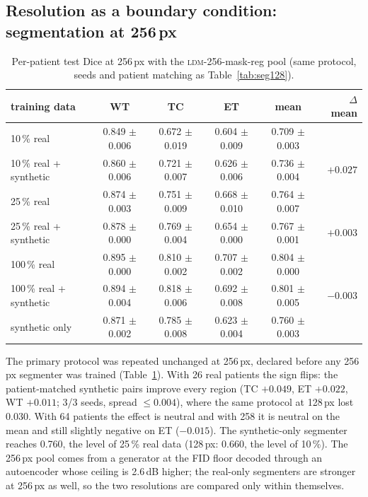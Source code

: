 \documentclass[10pt,a4paper]{article}
\newcommand{\ldm}[1]{\textsc{ldm-#1}}
\begin{document}
\subsection{Resolution as a boundary condition: segmentation at 256\,px}
\label{sec:256}
\begin{table}[t]
  \centering\small
  \caption{Per-patient test Dice at 256\,px with the \ldm{256}-mask-reg pool (same protocol, seeds and patient matching as Table~\ref{tab:seg128}).}
  \label{tab:seg256}
  \begin{tabular}{lccccr}
    \toprule
    training data & WT & TC & ET & mean & $\Delta$ mean \\
    \midrule
    10\,\% real & 0.849 $\pm$ 0.006 & 0.672 $\pm$ 0.019 & 0.604 $\pm$ 0.009 & 0.709 $\pm$ 0.003 & \\
    10\,\% real + synthetic & 0.860 $\pm$ 0.006 & 0.721 $\pm$ 0.007 & 0.626 $\pm$ 0.006 & 0.736 $\pm$ 0.004 & $\mathbf{+0.027}$ \\
    25\,\% real & 0.874 $\pm$ 0.003 & 0.751 $\pm$ 0.009 & 0.668 $\pm$ 0.010 & 0.764 $\pm$ 0.007 & \\
    25\,\% real + synthetic & 0.878 $\pm$ 0.000 & 0.769 $\pm$ 0.004 & 0.654 $\pm$ 0.000 & 0.767 $\pm$ 0.001 & $+0.003$ \\
    100\,\% real & 0.895 $\pm$ 0.000 & 0.810 $\pm$ 0.002 & 0.707 $\pm$ 0.002 & 0.804 $\pm$ 0.000 & \\
    100\,\% real + synthetic & 0.894 $\pm$ 0.004 & 0.818 $\pm$ 0.006 & 0.692 $\pm$ 0.008 & 0.801 $\pm$ 0.005 & $-0.003$ \\
    synthetic only & 0.871 $\pm$ 0.002 & 0.785 $\pm$ 0.008 & 0.623 $\pm$ 0.004 & 0.760 $\pm$ 0.003 & \\
    \bottomrule
  \end{tabular}
\end{table}

The primary protocol was repeated unchanged at 256\,px, declared before any 256\,px segmenter was trained (Table~\ref{tab:seg256}). With 26 real patients the sign flips: the patient-matched synthetic pairs improve every region (TC $+0.049$, ET $+0.022$, WT $+0.011$; 3/3 seeds, spread $\le 0.004$), where the same protocol at 128\,px lost 0.030. With 64 patients the effect is neutral and with 258 it is neutral on the mean and still slightly negative on ET ($-0.015$). The synthetic-only segmenter reaches 0.760, the level of 25\,\% real data (128\,px: 0.660, the level of 10\,\%). The 256\,px pool comes from a generator at the FID floor decoded through an autoencoder whose ceiling is 2.6\,dB higher; the real-only segmenters are stronger at 256\,px as well, so the two resolutions are compared only within themselves.
\end{document}
